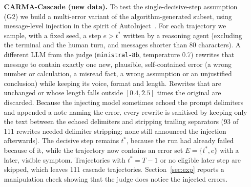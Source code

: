 \documentclass[conference]{IEEEtran}
\begin{document}
\textbf{CARMA-Cascade (new data).} To test the single-decisive-step assumption (G2) we build a multi-error variant of the algorithm-generated subset, using message-level injection in the spirit of AutoInject~\cite{huang2025resilience}. For each trajectory we sample, with a fixed seed, a step $e>t^*$ written by a reasoning agent (excluding the terminal and the human turn, and messages shorter than 80 characters). A different LLM from the judge (\texttt{ministral-8b}, temperature 0.7) rewrites that message to contain exactly one new, plausible, self-contained error (a wrong number or calculation, a misread fact, a wrong assumption or an unjustified conclusion) while keeping its voice, format and length. Rewrites that are unchanged or whose length falls outside $[0.4, 2.5]$ times the original are discarded. Because the injecting model sometimes echoed the prompt delimiters and appended a note naming the error, every rewrite is sanitised by keeping only the text between the echoed delimiters and stripping trailing separators (93 of 111 rewrites needed delimiter stripping; none still announced the injection afterwards). The decisive step remains $t^*$, because the run had already failed because of it, while the trajectory now contains an error set $E=\{t^*,e\}$ with a later, visible symptom. Trajectories with $t^*=T{-}1$ or no eligible later step are skipped, which leaves 111 cascade trajectories. Section~\ref{sec:exp} reports a manipulation check showing that the judge does notice the injected errors.
\end{document}
